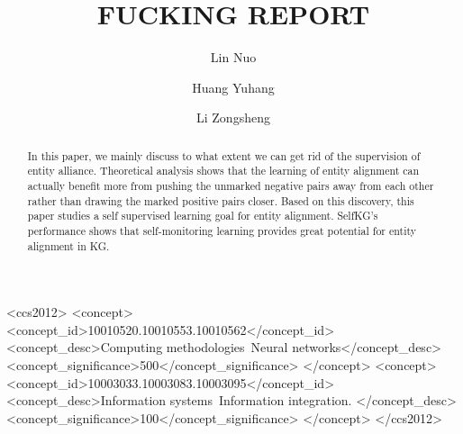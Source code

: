 \documentclass[sigconf]{acmart}
\begin{document}
\title{FUCKING REPORT}

\author{Lin Nuo}

\author{Huang Yuhang}

\author{Li Zongsheng}


\renewcommand{\shortauthors}{Lin and Huang, et al.}

\begin{abstract}

  In this paper, we mainly discuss to what extent we can get rid of the supervision of entity alliance. Theoretical analysis shows that the learning of entity alignment can actually benefit more from pushing the unmarked negative pairs away from each other rather than drawing the marked positive pairs closer. Based on this discovery, this paper studies a self supervised learning goal for entity alignment. SelfKG's performance shows that self-monitoring learning provides great potential for entity alignment in KG.
  
\end{abstract}

\begin{CCSXML}
<ccs2012>
 <concept>
  <concept_id>10010520.10010553.10010562</concept_id>
  <concept_desc>Computing methodologies~Neural networks</concept_desc>
  <concept_significance>500</concept_significance>
 </concept>
 <concept>
  <concept_id>10003033.10003083.10003095</concept_id>
  <concept_desc>Information systems~Information integration.
</concept_desc>
  <concept_significance>100</concept_significance>
 </concept>
</ccs2012>
\end{CCSXML}
\end{document}
